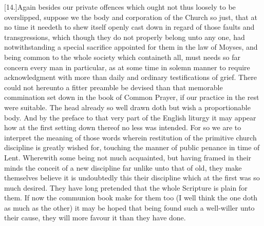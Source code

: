[14.]Again besides our private offences which ought not thus loosely to be overslipped, suppose we the body and corporation of the Church so just, that at no time it needeth to shew itself openly cast down in regard of those faults and transgressions, which though they do not properly belong unto any one, had notwithstanding a special sacrifice appointed for them in the law of Moyses, and being common to the whole society which containeth all, must needs so far concern every man in particular, as at some time in solemn manner to require acknowledgment with more than daily and ordinary testifications of grief. There could not hereunto a fitter preamble be devised than that memorable commination set down in the book of Common Prayer, if our practice in the rest were suitable. The head already so well drawn doth but wish a proportionable body. And by the preface to that very part of the English liturgy it may appear how at the first setting down thereof no less was intended. For so we are to interpret the meaning of those words wherein restitution of the primitive church discipline is greatly wished for, touching the manner of public penance in time of Lent. Wherewith some being not much acquainted, but having framed in their minds the conceit of a new discipline far unlike unto that of old, they make themselves believe it is undoubtedly this their discipline which at the first was so much desired. They have long pretended that the whole Scripture is plain for them. If now the communion book make for them too (I well think the one doth as much as the other) it may be hoped that being found such a well-willer unto their cause, they will more favour it than they have done.

